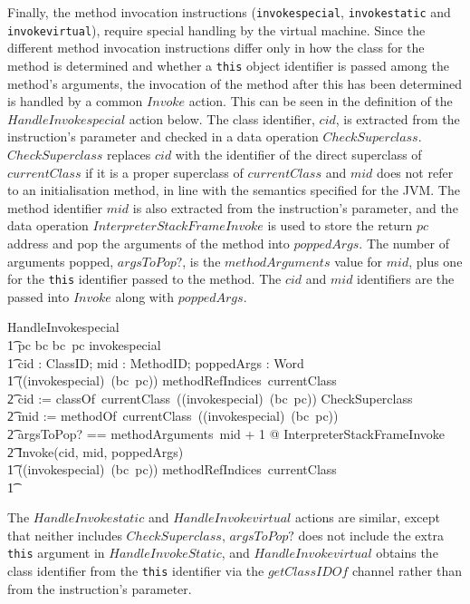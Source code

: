 Finally, the method invocation instructions (\texttt{invokespecial},
\texttt{invokestatic} and \texttt{invokevirtual}), require special
handling by the virtual machine.
Since the different method invocation instructions differ only in how
the class for the method is determined and whether a \texttt{this}
object identifier is passed among the method's arguments, the
invocation of the method after this has been determined is handled by
a common $Invoke$ action.
This can be seen in the definition of the $HandleInvokespecial$ action
below.
The class identifier, $cid$, is extracted from the instruction's
parameter and checked in a data operation $CheckSuperclass$.
$CheckSuperclass$ replaces $cid$ with the identifier of the direct
superclass of $currentClass$ if it is a proper superclass of
$currentClass$ and $mid$ does not refer to an initialisation method,
in line with the semantics specified for the JVM. 
The method identifier $mid$ is also extracted from the instruction's
parameter, and the data operation $InterpreterStackFrameInvoke$ is
used to store the return $pc$ address and pop the arguments of the
method into $poppedArgs$.
The number of arguments popped, $argsToPop?$, is the $methodArguments$
value for $mid$, plus one for the \texttt{this} identifier passed to
the method.
The $cid$ and $mid$ identifiers are the passed into $Invoke$ along
with $poppedArgs$.
\begin{circusaction}
  HandleInvokespecial \circdef \\
  \t1 \lcircguard pc \in \dom bc \land bc~pc \in \ran invokespecial \rcircguard \circguard \\
  \t1 \circvar cid : ClassID; mid : MethodID; poppedArgs : \seq Word \circspot \\
  \t1 \circif ((invokespecial\inv)~(bc~pc)) \in methodRefIndices~currentClass \circthen {} \\
  \t2 cid := classOf~currentClass~((invokespecial\inv)~(bc~pc)) \circseq \lschexpract CheckSuperclass \rschexpract \circseq \\
  \t2 mid := methodOf~currentClass~((invokespecial\inv)~(bc~pc)) \circseq \\
  \t2 \lschexpract \exists argsToPop? == methodArguments~mid + 1 @ InterpreterStackFrameInvoke \rschexpract \circseq \\
  \t2 Invoke(cid, mid, poppedArgs) \\
  \t1 {} \circelse ((invokespecial\inv)~(bc~pc)) \notin methodRefIndices~currentClass \circthen \Chaos \\
  \t1 \circfi
\end{circusaction}
The $HandleInvokestatic$ and $HandleInvokevirtual$ actions are
similar, except that neither includes $CheckSuperclass$, $argsToPop?$
does not include the extra \texttt{this} argument in
$HandleInvokeStatic$, and $HandleInvokevirtual$ obtains the class
identifier from the \texttt{this} identifier via the $getClassIDOf$
channel rather than from the instruction's parameter.

